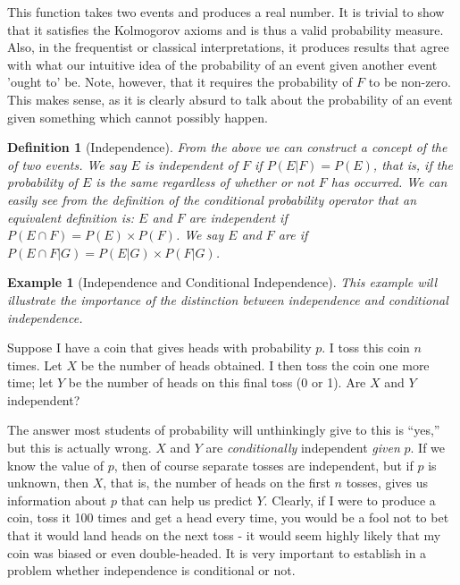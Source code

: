 \documentclass[12pt,a4paper]{article}
\newtheorem{defn}[thm]{Definition}
\newtheorem{ex}[thm]{Example}
\newcommand{\uline}[1]{\underline{\smash{#1}}}
\begin{document}
This function takes two events and produces a real number. It is trivial to show that it satisfies the Kolmogorov axioms and is thus a valid probability measure. Also, in the frequentist or classical interpretations, it produces results that agree with what our intuitive idea of the probability of an event given another event 'ought to' be. Note, however, that it requires the probability of $F$ to be non-zero. This makes sense, as it is clearly absurd to talk about the probability of an event given something which cannot possibly happen.

\begin{defn}[Independence]

From the above we can construct a concept of the \uline{independence} of two events. We say $E$ is independent of $F$ if $P(E|F) = P(E)$, that is, if the probability of $E$ is the same regardless of whether or not $F$ has occurred. We can easily see from the definition of the conditional probability operator that an equivalent definition is: $E$ and $F$ are independent if $P(E \cap F) = P(E) \times P(F)$. We say $E$ and $F$ are \uline{conditionally independent given $G$} if $P(E \cap F | G) = P(E|G) \times P(F|G)$.
\end{defn}

\begin{ex}[Independence and Conditional Independence]

This example will illustrate the importance of the distinction between independence and conditional independence.
\end{ex}

Suppose I have a coin that gives heads with probability $p$. I toss this coin $n$ times. Let $X$ be the number of heads obtained. I then toss the coin one more time; let $Y$ be the number of heads on this final toss (0 or 1). Are $X$ and $Y$ independent?

The answer most students of probability will unthinkingly give to this is ``yes,'' but this is actually wrong. $X$ and $Y$ are {\it conditionally} independent {\it given} $p$. If we know the value of $p$, then of course separate tosses are independent, but if $p$ is unknown, then $X$, that is, the number of heads on the first $n$ tosses, gives us information about $p$ that can help us predict $Y$. Clearly, if I were to produce a coin, toss it 100 times and get a head every time, you would be a fool not to bet that it would land heads on the next toss - it would seem highly likely that my coin was biased or even double-headed. It is very important to establish in a problem whether independence is conditional or not.
\end{document}
